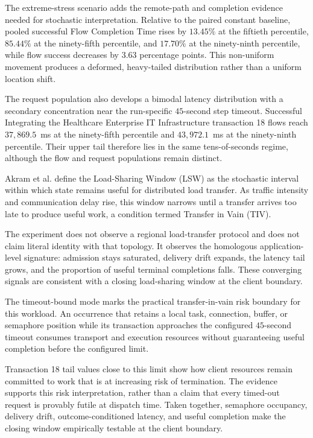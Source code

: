 \noindent The extreme-stress scenario adds the remote-path and completion evidence needed
for stochastic interpretation. Relative to the paired constant baseline, pooled
successful Flow Completion Time rises by $13.45\%$ at the fiftieth percentile,
$85.44\%$ at the ninety-fifth percentile, and $17.70\%$ at the ninety-ninth
percentile, while flow success decreases by $3.63$ percentage points. This
non-uniform movement produces a deformed, heavy-tailed distribution rather than
a uniform location shift.

\noindent The request population also develops a bimodal latency distribution with a
secondary concentration near the run-specific $45$-second step timeout.
Successful Integrating the Healthcare Enterprise IT Infrastructure transaction
18 flows reach $37{,}869.5$~ms at the ninety-fifth percentile and
$43{,}972.1$~ms at the ninety-ninth percentile. Their upper tail therefore lies
in the same tens-of-seconds regime, although the flow and request populations
remain distinct.

\noindent Akram et al. define the Load-Sharing Window (LSW) as the stochastic interval
within which state remains useful for distributed load transfer. As traffic
intensity and communication delay rise, this window narrows until a transfer
arrives too late to produce useful work, a condition termed Transfer in Vain
(TIV).

\noindent The experiment does not observe a regional load-transfer protocol and does
not claim literal identity with that topology. It observes the homologous
application-level signature: admission stays saturated, delivery drift expands,
the latency tail grows, and the proportion of useful terminal completions falls.
These converging signals are consistent with a closing load-sharing window at
the client boundary.

\noindent The timeout-bound mode marks the practical transfer-in-vain risk boundary for
this workload. An occurrence that retains a local task, connection, buffer, or
semaphore position while its transaction approaches the configured $45$-second
timeout consumes transport and execution resources without guaranteeing useful
completion before the configured limit.

\noindent Transaction 18 tail values close to this limit show how client resources
remain committed to work that is at increasing risk of termination. The
evidence supports this risk interpretation, rather than a claim that every
timed-out request is provably futile at dispatch time. Taken together,
semaphore occupancy, delivery drift, outcome-conditioned latency, and useful
completion make the closing window empirically testable at the client boundary.

